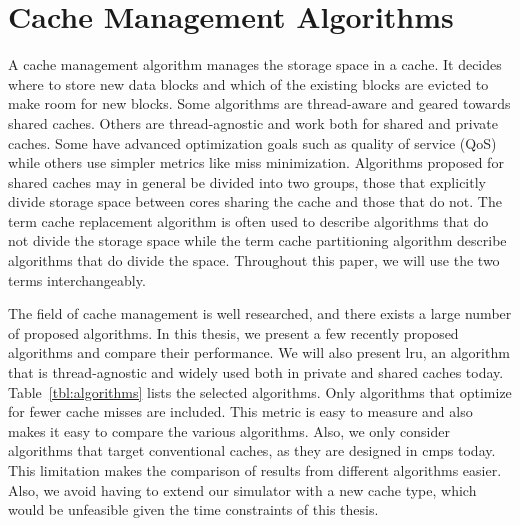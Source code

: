 
\chapter{Cache Management Algorithms}
\label{cpt:algorithms}


A cache management algorithm manages the storage space in a cache.
It decides where to store new data blocks and which of the existing blocks are evicted to make room for new blocks.
Some algorithms are thread-aware and geared towards shared caches.
Others are thread-agnostic and work both for shared and private caches.
Some have advanced optimization goals such as quality of service (QoS) while others use simpler metrics like miss minimization.
Algorithms proposed for shared caches may in general be divided into two groups, those that explicitly divide storage space between cores sharing the cache and those that do not.
The term cache replacement algorithm is often used to describe algorithms that do not divide the storage space while the term cache partitioning algorithm describe algorithms that do divide the space.
Throughout this paper, we will use the two terms interchangeably.

The field of cache management is well researched, and there exists a large number of proposed algorithms.
In this thesis, we present a few recently proposed algorithms and compare their performance.
We will also present \gls{lru}, an algorithm that is thread-agnostic and widely used both in private and shared caches today.
Table~\ref{tbl:algorithms} lists the selected algorithms.
Only algorithms that optimize for fewer cache misses are included.
This metric is easy to measure and also makes it easy to compare the various algorithms.
Also, we only consider algorithms that target conventional caches, as they are designed in \glspl{cmp} today.
This limitation makes the comparison of results from different algorithms easier.
Also, we avoid having to extend our simulator with a new cache type, which would be unfeasible given the time constraints of this thesis.

